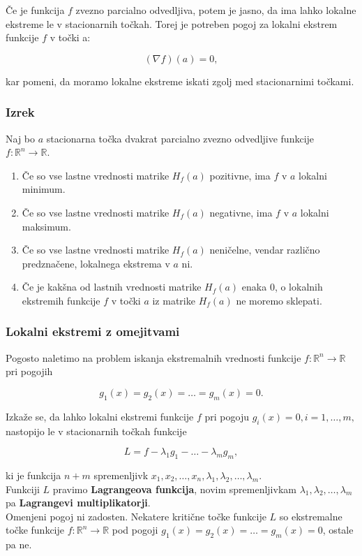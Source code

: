 \documentclass{article}
\begin{document}
\begin{multicols}{2}
	Če je funkcija \( f \) zvezno parcialno odvedljiva, potem je jasno, da ima lahko lokalne ekstreme le v stacionarnih točkah. Torej je potreben pogoj za lokalni ekstrem funkcije \( f \) v točki a:

	\[ (\nabla f)(a) = 0, \]

	kar pomeni, da moramo lokalne ekstreme iskati zgolj med stacionarnimi točkami.

	\subsubsection{Izrek}
	Naj bo \( a \) stacionarna točka dvakrat parcialno zvezno odvedljive funkcije \( f: \mathbb{R}^n \rightarrow \mathbb{R} \).

	\begin{enumerate}
		\item Če so vse lastne vrednosti matrike \( H_f(a) \) pozitivne, ima \( f \) v \( a \) lokalni minimum.
		\item Če so vse lastne vrednosti matrike \( H_f(a) \) negativne, ima \( f \) v \( a \) lokalni maksimum.
		\item Če so vse lastne vrednosti matrike \( H_f(a) \) neničelne, vendar različno predznačene, lokalnega ekstrema v \( a \) ni.
		\item Če je kakšna od lastnih vrednosti matrike \( H_f(a) \) enaka 0, o lokalnih ekstremih funkcije \( f \) v točki \( a \) iz matrike \( H_f(a) \) ne moremo sklepati.
	\end{enumerate}


	\subsubsection{Lokalni ekstremi z omejitvami}

	Pogosto naletimo na problem iskanja ekstremalnih vrednosti funkcije \( f: \mathbb{R}^n \rightarrow \mathbb{R} \) pri pogojih

	\[ g_1(x) = g_2(x) = \ldots = g_m(x) = 0. \]

	Izkaže se, da lahko lokalni ekstremi funkcije \( f \) pri pogoju \( g_i(x) = 0, i = 1, \ldots, m, \) nastopijo le v stacionarnih točkah funkcije

	\[ L = f - \lambda_1 g_1 - \ldots - \lambda_m g_m, \]

	ki je funkcija \( n + m \) spremenljivk \( x_1, x_2, \ldots, x_n, \lambda_1, \lambda_2, \ldots, \lambda_m \).\\
	Funkciji \( L \) pravimo \textbf{Lagrangeova funkcija}, novim spremenljivkam \( \lambda_1, \lambda_2, \ldots, \lambda_m \) pa \textbf{Lagrangevi multiplikatorji}.\\
	Omenjeni pogoj ni zadosten. Nekatere kritične točke funkcije \( L \) so ekstremalne točke funkcije \( f: \mathbb{R}^n \rightarrow \mathbb{R} \) pod pogoji \( g_1(x) = g_2(x) = \ldots = g_m(x) = 0 \), ostale pa ne.



\end{multicols}
\end{document}
